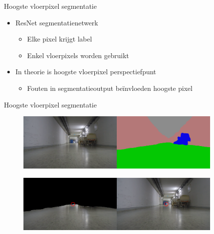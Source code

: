 \documentclass[11pt,t]{beamer}
\begin{document}
\begin{frame}[fragile]{Hoogste vloerpixel segmentatie}
	\begin{itemize}
		\item ResNet segmentatienetwerk
		\begin{itemize}
			\item Elke pixel krijgt label
			\item Enkel vloerpixels worden gebruikt
		\end{itemize}
		
		\item In theorie is hoogste vloerpixel perspectiefpunt
		\begin{itemize}
			\item Fouten in segmentatieoutput be\"{i}nvloeden hoogste pixel
		\end{itemize}
	\end{itemize}
\end{frame}

\begin{frame}[fragile]{Hoogste vloerpixel segmentatie}
	\begin{figure}
		\centering
		\tiny
		\includegraphics[width=0.9\textwidth]{graphics/segmentatie.png}
	\end{figure}
	\begin{figure}
		\centering
		\includegraphics[width=0.9\textwidth]{graphics/seg_highest.png}
	\end{figure}
\end{frame}
\end{document}
